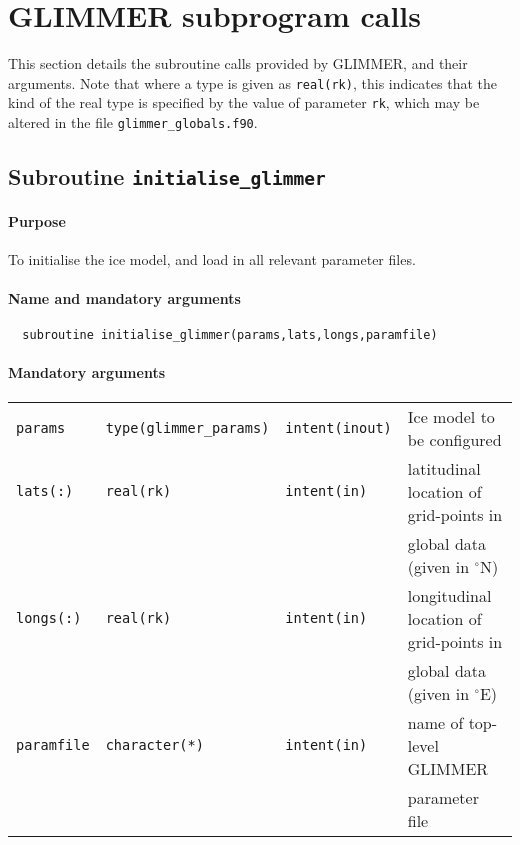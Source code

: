 \section{GLIMMER subprogram calls}
%
This section details the subroutine calls provided by GLIMMER, and their
arguments. Note that where a type is given as \texttt{real(rk)}, this
indicates that the kind of the real type is specified by the value of
parameter \texttt{rk}, which may be altered in the file \texttt{glimmer\_globals.f90}.
%
\subsection{Subroutine \texttt{initialise\_glimmer}}
%
\paragraph{Purpose} To initialise the ice model, and load in all relevant parameter files.
%
\paragraph{Name and mandatory arguments}
%
\begin{verbatim}
  subroutine initialise_glimmer(params,lats,longs,paramfile)
\end{verbatim}
%
\paragraph{Mandatory arguments}
%
\begin{center}
\begin{tabular}{llll}
\texttt{params}    & \texttt{type(glimmer\_params)} & \texttt{intent(inout)} &
Ice model to be configured \\
\texttt{lats(:)}   & \texttt{real(rk)} & \texttt{intent(in)} & latitudinal location of grid-points in \\
 & & & global data (given in $^{\circ}\mathrm{N}$)\\
\texttt{longs(:)}  & \texttt{real(rk)} & \texttt{intent(in)} & longitudinal location of grid-points in \\
 & & & global data (given in $^{\circ}\mathrm{E}$)\\
\texttt{paramfile} & \texttt{character(*)} & \texttt{intent(in)} & name of
top-level GLIMMER \\
 & & & parameter file \\
\end{tabular}
\end{center}
%
